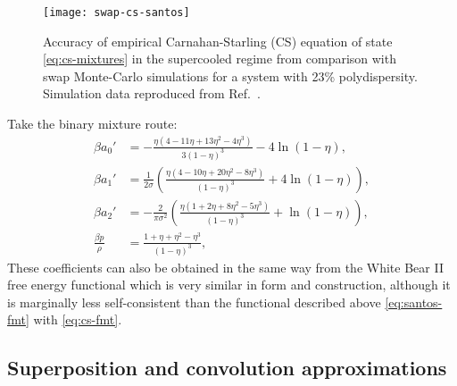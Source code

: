 \begin{SCfigure}
  \texttt{[image: swap-cs-santos]}
  \caption[Accuracy of Carnahan-Starling equation at high densities]{
    Accuracy of empirical Carnahan-Starling (CS) equation of state \eqref{eq:cs-mixtures} in the supercooled regime from comparison with swap Monte-Carlo simulations for a system with 23\% polydispersity.
    Simulation data reproduced from Ref.\ \cite{BerthierPRL2016}.
  }
  \label{fig:swap-eos}
\end{SCfigure}

Take the binary mixture route:
\begin{subequations}\label{eq:cs-spt-coefficients-parallel}
  \begin{align}
    \beta a_0'
    &=
    - \frac{\eta(4 - 11\eta + 13\eta^2 - 4\eta^3)}{3(1-\eta)^3}
    - 4 \ln{(1-\eta)},
    \\
    \beta a_1'
    &=
    \frac{1}{2\sigma} \left(
    \frac{\eta(4 - 10\eta + 20\eta^2 - 8\eta^3)}{(1-\eta)^3}
    + 4 \ln{(1-\eta)}
    \right),
    \\
    \beta a_2'
    &=
    - \frac{2}{\pi \sigma^2}
    \left(
    \frac{\eta(1 + 2\eta + 8\eta^2 - 5\eta^3)}{(1-\eta)^3}
    + \ln{(1-\eta)}
    \right),
    \\
    \frac{\beta p}{\rho}
    &=
    \frac{1 + \eta + \eta^2 - \eta^3}{(1-\eta)^3},
  \end{align}
\end{subequations}
These coefficients can also be obtained in the same way from the White Bear II free energy functional \cite{Hansen-GoosJCP2006, Hansen-GoosJPCM2006} which is very similar in form and construction, although it is marginally less self-consistent than the functional described above \eqref{eq:santos-fmt} with \eqref{eq:cs-fmt}.


\subsection{Superposition and convolution approximations}

